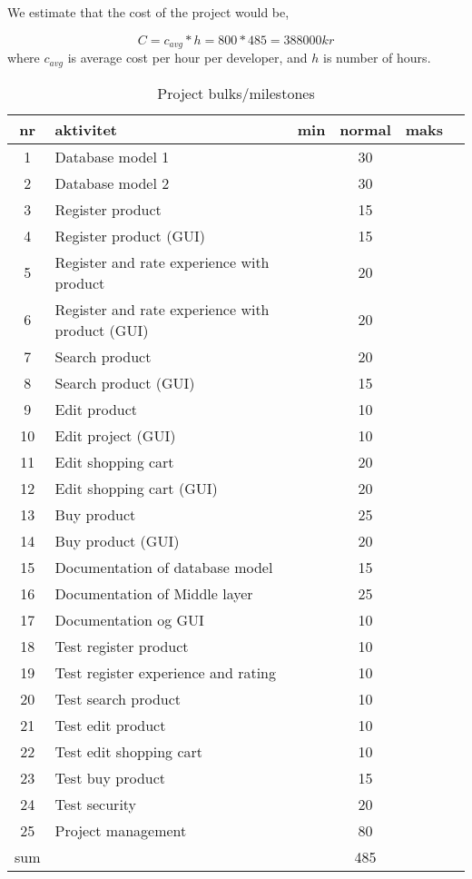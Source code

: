 
We estimate that the cost of the project would be,

\begin{displaymath}
C = c_{avg} * h = 800 * 485 = 388 000 kr
\end{displaymath}
where \(c_{avg}\) is average cost per hour per developer, and \(h\) is number of hours.

\begin{table}
    \centering
	\begin{tabular}{|c|l|c|c|c|c|}
	\hline
	\textbf{nr}& \textbf{aktivitet}& \textbf{min}& \textbf{normal}& \textbf{maks}\\ \hline
	1 & Database model 1 & & 30 & \\ 
	2 & Database model 2& & 30 & \\ 
	3 & Register product & & 15 & \\ 
	4 & Register product (GUI) & & 15 & \\ 
	5 & Register and rate experience with product & & 20 & \\ 
	6 & Register and rate experience with product (GUI) & & 20 & \\ 
	7 & Search product & & 20 & \\ 
	8 & Search product (GUI) & & 15 & \\ 
	9 & Edit product & & 10 & \\ 
	10 & Edit project (GUI) & & 10 & \\ 
	11 & Edit shopping cart & & 20 & \\ 
	12 & Edit shopping cart (GUI) & & 20 & \\ 
	13 & Buy product & & 25 & \\ 
	14 & Buy product (GUI) & & 20 & \\ 
	15 & Documentation of database model & & 15 & \\ 
	16 & Documentation of Middle layer & & 25 & \\ 
	17 & Documentation og GUI & & 10 & \\ 
	18 & Test register product & & 10 & \\ 
	19 & Test register experience and rating & & 10 & \\ 
	20 & Test search product & & 10 & \\ 
	21 & Test edit product & & 10 & \\ 
	22 & Test edit shopping cart & & 10 & \\ 
	23 & Test buy product & & 15 & \\ 
	24 & Test security & & 20 & \\ 
	25 & Project management & & 80 &\\ \hline
	sum & & & 485 & \\ \hline \hline
	\end{tabular}
\caption {Project bulks/milestones}
\end{table}

